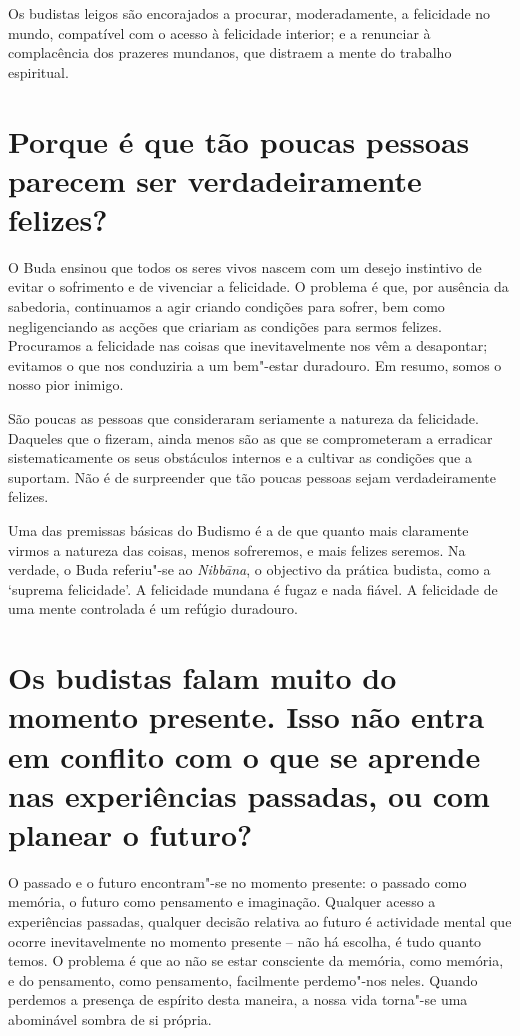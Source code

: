 Os budistas leigos são encorajados a procurar, moderadamente, a
felicidade no mundo, compatível com o acesso à felicidade interior; e a
renunciar à complacência dos prazeres mundanos, que distraem a mente do
trabalho espiritual.

\section{Porque é que tão poucas pessoas parecem ser verdadeiramente felizes?}

O Buda ensinou que todos os seres vivos nascem com um desejo instintivo
de evitar o sofrimento e de vivenciar a felicidade. O problema é que,
por ausência da sabedoria, continuamos a agir criando condições para
sofrer, bem como negligenciando as acções que criariam as condições para
sermos felizes. Procuramos a felicidade nas coisas que inevitavelmente
nos vêm a desapontar; evitamos o que nos conduziria a um bem"-estar
duradouro. Em resumo, somos o nosso pior inimigo.

São poucas as pessoas que consideraram seriamente a natureza da
felicidade. Daqueles que o fizeram, ainda menos são as que se
comprometeram a erradicar sistematicamente os seus obstáculos internos e
a cultivar as condições que a suportam. Não é de surpreender que tão
poucas pessoas sejam verdadeiramente felizes.

Uma das premissas básicas do Budismo é a de que quanto mais claramente
virmos a natureza das coisas, menos sofreremos, e mais felizes seremos.
Na verdade, o Buda referiu"-se ao \emph{Nibbāna}, o objectivo da prática
budista, como a `suprema felicidade'. A felicidade mundana é fugaz e
nada fiável. A felicidade de uma mente controlada é um refúgio
duradouro.

\section{Os budistas falam muito do momento presente. Isso não entra em conflito
  com o que se aprende nas experiências passadas, ou com planear o futuro?}

O passado e o futuro encontram"-se no momento presente: o passado como
memória, o futuro como pensamento e imaginação. Qualquer acesso a
experiências passadas, qualquer decisão relativa ao futuro é actividade
mental que ocorre inevitavelmente no momento presente -- não há escolha,
é tudo quanto temos. O problema é que ao não se estar consciente da
memória, como memória, e do pensamento, como pensamento, facilmente
perdemo"-nos neles. Quando perdemos a presença de espírito desta
maneira, a nossa vida torna"-se uma abominável sombra de si própria.

